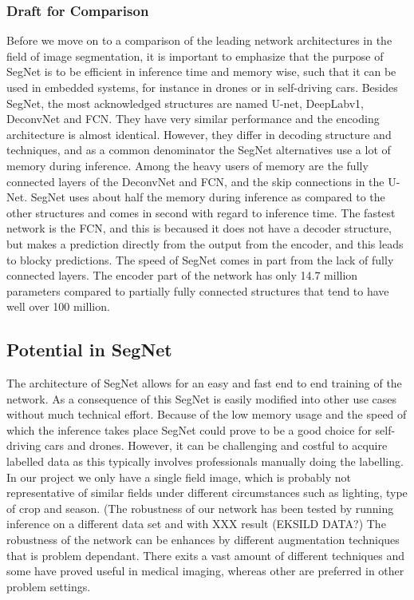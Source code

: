 \documentclass{article}
\begin{document}
\subsubsection{Draft for Comparison}
Before we move on to a comparison of the leading network architectures in the field of image segmentation, it is important to emphasize that the purpose of SegNet is to be efficient in inference time and memory wise, such that it can be used in embedded systems, for instance in drones or in self-driving cars.
Besides SegNet, the most acknowledged structures are named U-net, DeepLabv1, DeconvNet and FCN.
They have very similar performance and the encoding architecture is almost identical.
However, they differ in decoding structure and techniques, and as a common denominator the SegNet alternatives use a lot of memory during inference.
Among the heavy users of memory are the fully connected layers of the DeconvNet and FCN, and the skip connections in the U-Net.
SegNet uses about half the memory during inference as compared to the other structures and comes in second with regard to inference time.
The fastest network is the FCN, and this is becaused it does not have a decoder structure, but makes a prediction directly from the output from the encoder, and this leads to blocky predictions.
The speed of SegNet comes in part from the lack of fully connected layers.
The encoder part of the network has only 14.7 million parameters compared to partially fully connected structures that tend to have well over 100 million. \cite{seg}

\subsection{Potential in SegNet}
The architecture of SegNet allows for an easy and fast end to end training of the network. As a consequence of this SegNet is easily modified into other use cases without much technical effort. Because of the low memory usage and the speed of which the inference takes place SegNet could prove to be a good choice for self-driving cars and drones. However, it can be challenging and costful to acquire labelled data as this typically involves professionals manually doing the labelling. In our project we only have a single field image, which is probably not representative of similar fields under different circumstances such as lighting, type of crop and season. (The robustness of our network has been tested by running inference on a different data set and with XXX result (EKSILD DATA?)  The robustness of the network can be enhances by different augmentation techniques that is problem dependant. There exits a vast amount of different techniques and some have proved useful in medical imaging, whereas other are preferred in other problem settings. \cite{seg}
\end{document}
